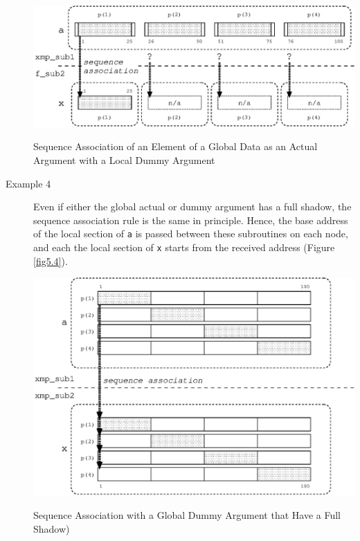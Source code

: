 \begin{description}
\begin{myfigure}
 \includegraphics[scale=0.7]{figs/fig5.3.eps}
 \caption{Sequence Association of an Element of a Global Data as an
 Actual Argument with a Local Dummy Argument}
 \label{fig5.3}
\end{myfigure}

\item[Example 4]

	   Even if either the global actual or dummy argument has a full
	   shadow, the sequence association rule is the same in
	   principle. Hence, the base address of the local section of
	   {\tt a} is passed between these subroutines on each node, and
	   each the local section of {\tt x} starts from the received
	   address (Figure \ref{fig5.4}).

\clearpage

\begin{myfigure}
 \includegraphics[scale=0.7]{figs/fig5.4.eps}
 \caption{Sequence Association with a Global Dummy Argument that Have a
 Full Shadow)}
 \label{fig5.4}
\end{myfigure}

\end{description}


